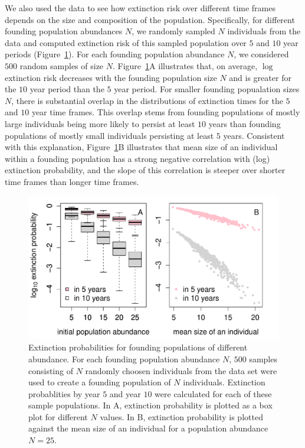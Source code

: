 \documentclass[12pt]{amsart}\usepackage[]{graphicx}\usepackage[]{color}
\makeatletter
\def\maxwidth{ %
  \ifdim\Gin@nat@width>\linewidth
    \linewidth
  \else
    \Gin@nat@width
  \fi
}
\newenvironment{knitrout}{}{} %
\makeatother
\begin{document}
We also used the data to see how extinction risk over different time frames depends on the size and composition of the population. Specifically, for different founding population abundances $N$, we randomly sampled $N$ individuals from the data and computed extinction risk of this sampled population over $5$ and $10$ year periods (Figure~\ref{fig:sampling}). For each founding population abundance $N$, we considered $500$ random samples of size $N$. Figure~\ref{fig:sampling}A illustrates that, on average, $\log$ extinction risk decreases with the founding population size $N$ and is greater for the $10$ year period than the $5$ year period. For smaller founding popualation sizes $N$, there is substantial overlap in the distributions of extinction times for the $5$ and $10$ year time frames. This overlap stems from founding populations of mostly large individuals being more likely to persist at least $10$ years than founding populations of mostly small individuals persisting at least $5$ years. Consistent with this explanation, Figure~\ref{fig:sampling}B illustrates that mean size of an individual within a founding  population has a strong negative correlation with (log) extinction probability, and the slope of this correlation is steeper over shorter time frames than longer time frames.

\begin{knitrout}
\color{fgcolor}\begin{figure}
\includegraphics[width=\maxwidth]{figure/sampling-1} \caption[Extinction probabilities for founding populations of different abundance]{Extinction probabilities for founding populations of different abundance. For each founding population abundance $N$, $500$ samples consisting of $N$ randomly choosen individuals from the data set were used to create a founding population of $N$ individuals. Extinction probablities by year $5$ and year $10$ were calculated for each of these sample populations. In A, extinction probability is plotted as a box plot for different $N$ values. In B, extinction probability is plotted against the mean size of an individual for a population abundance $N=25$.}\label{fig:sampling}
\end{figure}


\end{knitrout}
\end{document}
